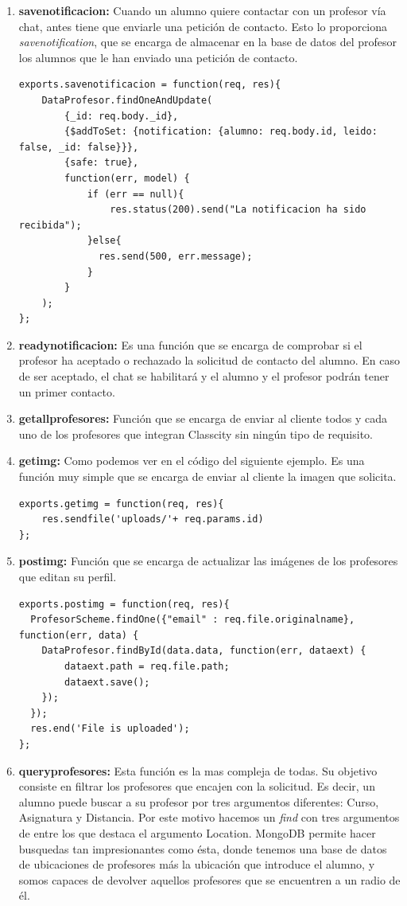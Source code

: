 \begin{itemize}
\begin{enumerate}
    \item \textbf {savenotificacion: } Cuando un alumno quiere contactar con un profesor vía chat, antes tiene que enviarle una petición de contacto. Esto lo proporciona \textit{savenotification}, que se encarga de almacenar en la base de datos del profesor los alumnos que le han enviado una petición de contacto.
\begin{lstlisting}
exports.savenotificacion = function(req, res){
    DataProfesor.findOneAndUpdate(
        {_id: req.body._id},
        {$addToSet: {notification: {alumno: req.body.id, leido: false, _id: false}}},
        {safe: true},
        function(err, model) {
            if (err == null){
                res.status(200).send("La notificacion ha sido recibida");
            }else{
              res.send(500, err.message);
            }
        }
    );
};

\end{lstlisting}

    \item \textbf {readynotificacion: }Es una función que se encarga de comprobar si el profesor ha aceptado o rechazado la solicitud de contacto del alumno. En caso de ser aceptado, el chat se habilitará y el alumno y el profesor podrán tener un primer contacto.

    \item \textbf {getallprofesores: } Función que se encarga de enviar al cliente todos y cada uno de los profesores que integran Classcity sin ningún tipo de requisito.
    \item \textbf {getimg: } Como podemos ver en el código del siguiente ejemplo. Es una función muy simple que se encarga de enviar al cliente la imagen que solicita.
    \begin{lstlisting}
exports.getimg = function(req, res){
    res.sendfile('uploads/'+ req.params.id)
};
    \end{lstlisting}
    \item \textbf {postimg: } Función que se encarga de actualizar las imágenes de los profesores que editan su perfil.
\begin{lstlisting}
exports.postimg = function(req, res){
  ProfesorScheme.findOne({"email" : req.file.originalname}, function(err, data) {
    DataProfesor.findById(data.data, function(err, dataext) {
        dataext.path = req.file.path;
        dataext.save();
    });
  });
  res.end('File is uploaded');
};
\end{lstlisting}

    \item \textbf {queryprofesores: } Esta función es la  mas compleja de todas. Su objetivo consiste en filtrar los profesores que encajen con la solicitud. Es decir, un alumno puede buscar a su profesor por tres argumentos diferentes: Curso, Asignatura y Distancia. Por este motivo hacemos un \textit{find} con tres argumentos de entre los que destaca el argumento Location. MongoDB permite hacer busquedas tan impresionantes como ésta, donde tenemos una base de datos de ubicaciones de profesores más la ubicación que introduce el alumno, y somos capaces de devolver aquellos profesores que se encuentren a un radio de él.


\end{enumerate}
\end{itemize}
